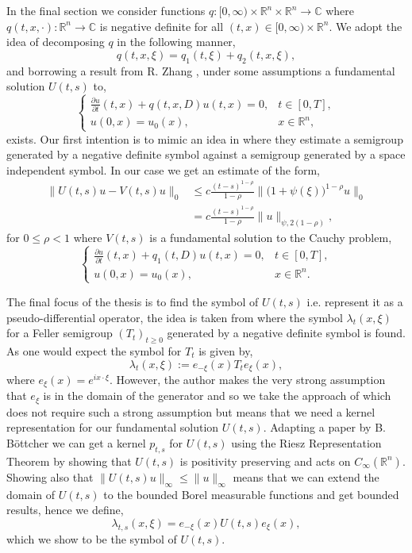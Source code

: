 \documentclass[a4paper, 12pt]{report}
\theoremstyle{remark}
\theoremstyle{definition}
\begin{document}
In the final section we consider functions $q : [0, \infty) \times \mathbb{R}^n \times \mathbb{R}^n \to \mathbb{C}$ where $q(t, x, \cdot) : \mathbb{R}^n \to \mathbb{C}$ is negative definite for all $(t, x) \in [0, \infty) \times \mathbb{R}^n$.  We adopt the idea of decomposing $q$ in the following manner,
$$
q(t, x, \xi) = q_1(t, \xi) + q_2(t, x, \xi),
$$
and borrowing a result from R. Zhang \cite{RZ}, under some assumptions a fundamental solution $U(t, s)$ to,
$$
\begin{cases}
\frac{\partial u}{\partial t}(t, x) + q(t, x, D)u(t, x) = 0, & t \in [0, T],\\
u(0, x) = u_0(x), & x \in \mathbb{R}^n,
\end{cases}
$$
exists.  Our first intention is to mimic an idea in \cite{EstimatesPaper} where they estimate a semigroup generated by a negative definite symbol against a semigroup generated by a space independent symbol.  In our case we get an estimate of the form,
$$
\begin{aligned}
\|U(t, s)u - V(t, s)u\|_0 & \le c\frac{(t - s)^{1 - \rho}}{1 - \rho}\big\|\big(1 + \psi(\xi)\big)^{1 - \rho}u\big\|_0\\
& = c\frac{(t - s)^{1 - \rho}}{1 - \rho}\|u\|_{\psi, 2(1 - \rho)},
\end{aligned}
$$
for $0 \le \rho < 1$ where $V(t, s)$ is a fundamental solution to the Cauchy problem,
$$
\begin{cases}
\frac{\partial u}{\partial t}(t, x) + q_1(t, D)u(t, x) = 0, & t \in [0, T],\\
u(0, x) = u_0(x), & x \in \mathbb{R}^n.
\end{cases}
$$

The final focus of the thesis is to find the symbol of $U(t, s)$ i.e. represent it as a pseudo-differential operator, the idea is taken from \cite{SymbolPaper} where the symbol $\lambda_t(x, \xi)$ for a Feller semigroup $(T_t)_{t \ge 0}$ generated by a negative definite symbol is found.  As one would expect the symbol for $T_t$ is given by,
$$
\lambda_t(x, \xi) := e_{-\xi}(x)T_te_\xi(x),
$$
where $e_\xi(x) = e^{ix\cdot\xi}$.  However, the author makes the very strong assumption that $e_\xi$ is in the domain of the generator and so we take the approach of \cite{Conservative} which does not require such a strong assumption but means that we need a kernel representation for our fundamental solution $U(t, s)$.  Adapting a paper by B. B\"ottcher \cite{KernelPaper} we can get a kernel $p_{t, s}$ for $U(t, s)$ using the Riesz Representation Theorem by showing that $U(t, s)$ is positivity preserving and acts on $C_\infty(\mathbb{R}^n)$.  Showing also that $\|U(t, s)u\|_\infty \le \|u\|_\infty$ means that we can extend the domain of $U(t, s)$ to the bounded Borel measurable functions and get bounded results, hence we define,
$$
\lambda_{t, s}(x, \xi) = e_{-\xi}(x)U(t, s)e_\xi(x),
$$
which we show to be the symbol of $U(t, s)$.
\end{document}
